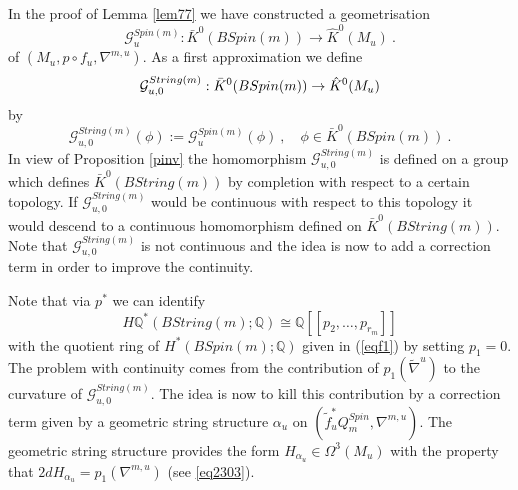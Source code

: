 \documentclass[12pt]{article}
\newcommand{\cG}{{\mathcal{G}}}
\newcommand{\Q}{{\mathbb{Q}}}
\begin{document}
In the proof of Lemma \ref{lem77} we have  constructed  a geometrisation
  $$\cG^{Spin(m)}_{u}:\bar K^{0}(BSpin(m))\to \hat K^{0}(M_{u})\ .$$ of $(M_{u}, p\circ f_{u},\nabla^{m,u})$.  
As a first approximation   we define
$$\cG^{String(m)}_{u,0}: \textcolor{black}{\bar K^{0}(BSpin(m))}  \to \hat K^{0}(M_{u})$$ by $$\cG^{String(m)}_{u,0}( \phi ):=\cG_{u}^{Spin(m)}(\phi)\ , \quad \phi\in \bar K^{0}(BSpin(m))\ .$$  
\color{black}In view of Proposition \ref{pinv}  the homomorphism
$\cG^{String(m)}_{u,0}$ is defined on a group which  defines $\bar K^{0}(BString(m))$ by completion with respect to a certain topology.  If $\cG^{String(m)}_{u,0}$  would be continuous with respect    to this topology it would descend to a continuous homomorphism defined on $\bar K^{0}(BString(m))$. Note that $\cG^{String(m)}_{u,0}$ is not continuous and 
 the idea is now to add a correction term  in order to improve the continuity. 
  










 
 
Note that via $p^{*}$ we can identify 
 $$H\Q^{*}(BString(m);\Q)\cong \Q[[p_{2},\dots,p_{r_{m}}]]$$ 
 with the  quotient ring of $H^{*}(BSpin(m);\Q)$ given in  (\ref{eqf1}) by setting $p_{1}= 0$.
The problem with continuity comes from the contribution of $p_{1}(\tilde \nabla^{u})$ to the
curvature of $\cG_{u,0}^{String(m)}$.
The idea is now to kill this contribution by a correction term given by a geometric string structure
 $\alpha_{u}$ on $(\tilde f_{u}^{*}Q^{Spin}_{m},\nabla^{m,u})$. The geometric string structure provides the form $H_{\alpha_{u}}\in \Omega^{3}(M_{u})$ with the property that $2dH_{\alpha_{u}}=p_{1}(\nabla^{m,u})$ (see \ref{eq2303}).
\end{document}
